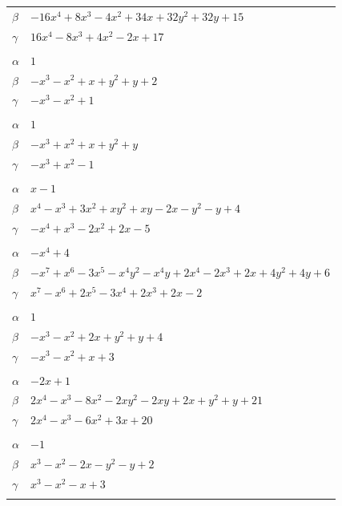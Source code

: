 \documentclass[11pt]{article}
\begin{document}
\begin{longtable}{@{}ll@{}}
$\beta$ & $-16x^{4}+8x^{3}-4x^{2}+34x+32y^{2}+32y+15$\\
$\gamma$ & $16x^{4}-8x^{3}+4x^{2}-2x+17$\\
\addlinespace[3pt]
\multicolumn{2}{@{}l}{$\{i,j\}=\{3,18\}$, $k_{ij}=2\cdot 3$}\\
$\alpha$ & $1$\\
$\beta$ & $-x^{3}-x^{2}+x+y^{2}+y+2$\\
$\gamma$ & $-x^{3}-x^{2}+1$\\
\addlinespace[3pt]
\multicolumn{2}{@{}l}{$\{i,j\}=\{3,21\}$, $k_{ij}=2^{2}$}\\
$\alpha$ & $1$\\
$\beta$ & $-x^{3}+x^{2}+x+y^{2}+y$\\
$\gamma$ & $-x^{3}+x^{2}-1$\\
\addlinespace[3pt]
\multicolumn{2}{@{}l}{$\{i,j\}=\{3,23\}$, $k_{ij}=5$}\\
$\alpha$ & $x-1$\\
$\beta$ & $x^{4}-x^{3}+3x^{2}+xy^{2}+xy-2x-y^{2}-y+4$\\
$\gamma$ & $-x^{4}+x^{3}-2x^{2}+2x-5$\\
\addlinespace[3pt]
\multicolumn{2}{@{}l}{$\{i,j\}=\{3,25\}$, $k_{ij}=2\cdot 11$}\\
$\alpha$ & $-x^{4}+4$\\
$\beta$ & $-x^{7}+x^{6}-3x^{5}-x^{4}y^{2}-x^{4}y+2x^{4}-2x^{3}+2x+4y^{2}+4y+6$\\
$\gamma$ & $x^{7}-x^{6}+2x^{5}-3x^{4}+2x^{3}+2x-2$\\
\addlinespace[3pt]
\multicolumn{2}{@{}l}{$\{i,j\}=\{3,26\}$, $k_{ij}=11$}\\
$\alpha$ & $1$\\
$\beta$ & $-x^{3}-x^{2}+2x+y^{2}+y+4$\\
$\gamma$ & $-x^{3}-x^{2}+x+3$\\
\addlinespace[3pt]
\multicolumn{2}{@{}l}{$\{i,j\}=\{3,28\}$, $k_{ij}=5\cdot 13$}\\
$\alpha$ & $-2x+1$\\
$\beta$ & $2x^{4}-x^{3}-8x^{2}-2xy^{2}-2xy+2x+y^{2}+y+21$\\
$\gamma$ & $2x^{4}-x^{3}-6x^{2}+3x+20$\\
\addlinespace[3pt]
\multicolumn{2}{@{}l}{$\{i,j\}=\{3,30\}$, $k_{ij}=1$}\\
$\alpha$ & $-1$\\
$\beta$ & $x^{3}-x^{2}-2x-y^{2}-y+2$\\
$\gamma$ & $x^{3}-x^{2}-x+3$\\
\addlinespace[3pt]

\end{longtable}
\end{document}
